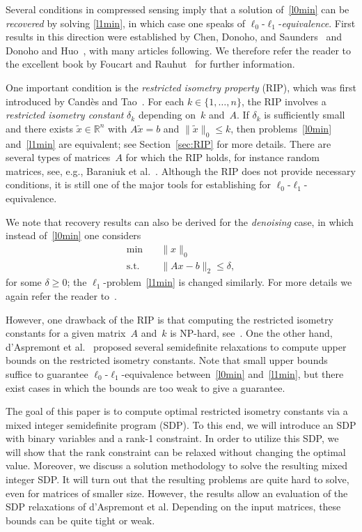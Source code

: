 \documentclass[a4paper,11pt,1p]{elsarticle}
\newcommand{\Norm}[2]{\lVert{#1}\rVert_{#2}}
\newcommand{\R}{\mathds{R}}
\begin{document}
Several conditions in compressed sensing imply that a solution
of~\eqref{l0min} can be \emph{recovered} by solving \eqref{l1min}, in which
case one speaks of $\ell_0$-$\ell_1$-\emph{equivalence}. First results in
this direction were established by Chen, Donoho, and
Saunders~\cite{CheDS99} and Donoho and Huo~\cite{DH01}, with many articles
following. We therefore refer the reader to the excellent book by Foucart
and Rauhut~\cite{FouR13} for further information.

One important condition is the \emph{restricted isometry property} (RIP),
which was first introduced by Cand\`es and Tao~\cite{CT05}. For each $k \in
\{1, \dots, n\}$, the RIP involves a \emph{restricted isometry constant}
$\delta_k$ depending on~$k$ and~$A$. If $\delta_k$ is sufficiently small
and there exists $\tilde{x} \in \R^n$ with $A \tilde{x} = b$ and
$\Norm{\tilde{x}}{0} \leq k$, then problems~\eqref{l0min} and~\eqref{l1min}
are equivalent; see Section~\ref{sec:RIP} for more details. There are
several types of matrices~$A$ for which the RIP holds, for instance random
matrices, see, e.g., Baraniuk et al.~\cite{BDDW08}. Although the RIP does
not provide necessary conditions, it is still one of the major tools for
establishing for $\ell_0$-$\ell_1$-equivalence.

We note that recovery results can also be derived for the \emph{denoising}
case, in which instead of~\eqref{l0min} one considers
\begin{align}\label{l0minDenoising}
  \min \quad & \Norm{x}{0} \tag{$P_0^\delta$}\\
  \text{s.t.} \quad & \Norm{Ax - b}{2} \leq \delta, \nonumber
\end{align}
for some $\delta \geq 0$; the $\ell_1$-problem~\eqref{l1min} is changed
similarly. For more details we again refer the reader to~\cite{FouR13}.

However, one drawback of the RIP is that computing the restricted isometry
constants for a given matrix~$A$ and~$k$ is NP-hard, see~\cite{PT14}. One
the other hand, d'Aspremont et al.~\cite{Asp07,Asp08} proposed several
semidefinite relaxations to compute upper bounds on the restricted isometry
constants. Note that small upper bounds suffice to guarantee
$\ell_0$-$\ell_1$-equivalence between~\eqref{l0min} and~\eqref{l1min}, but
there exist cases in which the bounds are too weak to give a guarantee.

The goal of this paper is to compute optimal restricted isometry constants
via a mixed integer semidefinite program (SDP). To this end, we will
introduce an SDP with binary variables and a rank-1 constraint. In order to
utilize this SDP, we will show that the rank constraint can be relaxed
without changing the optimal value. Moreover, we discuss a solution
methodology to solve the resulting mixed integer SDP. It will turn out that
the resulting problems are quite hard to solve, even for matrices of
smaller size. However, the results allow an evaluation of the SDP
relaxations of d'Aspremont et al. Depending on the input matrices, these
bounds can be quite tight or weak.
\end{document}
